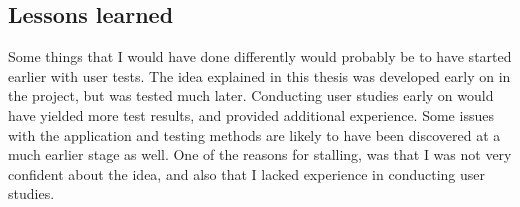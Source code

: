 \subsection{Lessons learned}

Some things that I would have done differently would probably be to have started earlier with user tests. The idea explained in this thesis was developed early on in the project, but was tested much later. Conducting user studies early on would have yielded more test results, and provided additional experience. Some issues with the application and testing methods are likely to have been discovered at a much earlier stage as well. One of the reasons for stalling, was that I was not very confident about the idea, and also that I lacked experience in conducting user studies.





















